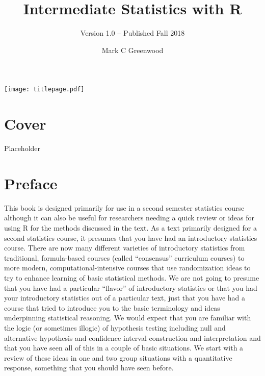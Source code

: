 \documentclass[]{book}
\title{Intermediate Statistics with R}
\subtitle{Version 1.0 -- Published Fall 2018}
\author{Mark C Greenwood}
\date{}
\renewcommand*{\maketitle}{%
\begin{titlepage}
\texttt{[image: titlepage.pdf]}
\end{titlepage}
}
\begin{document}
\maketitle

\cleardoublepage
\frontmatter

{
\setcounter{tocdepth}{1}
\tableofcontents
}
\hypertarget{cover}{%
\chapter*{Cover}\label{cover}}

Placeholder

\mainmatter

\hypertarget{chapter1}{%
\chapter{Preface}\label{chapter1}}

This book is designed primarily for use in a second semester
statistics course although it can also be
useful for researchers needing a quick review or ideas for using R for the
methods discussed in the text. As a text primarily designed for a second
statistics course, it presumes that you have had an introductory statistics
course. There are now many different varieties of introductory statistics from
traditional, formula-based courses (called ``consensus'' curriculum courses) to
more modern, computational-intensive courses that use randomization ideas to try to
enhance learning of basic statistical methods. We are not going to presume that
you have had a particular ``flavor'' of introductory statistics or that you had
your introductory statistics out of a particular text, just that you have had a
course that tried to introduce you to the basic terminology and ideas
underpinning statistical reasoning. We would expect that you are familiar with
the logic (or sometimes illogic) of hypothesis testing including null and
alternative hypothesis  and confidence interval construction and interpretation
and that you have seen all of this in a couple of basic situations. We start
with a review of these ideas in one and two group situations with a
quantitative response, something that you should have seen before.
\end{document}
